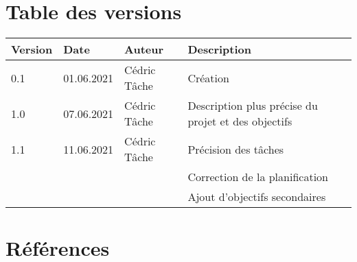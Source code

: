 \documentclass[french,11pt]{article}
\begin{document}


\section *{Table des versions}
\vspace*{0.5 cm}

\begin{table}[h]
    \begin{tabularx}{\columnwidth}{ | p{1.5cm} | p{1.7cm} | p{2.5cm} | X |}
        \hline
        \textbf{Version} & \textbf{Date} & \textbf{Auteur} & \textbf{Description} \\
        \hline
        0.1 & 01.06.2021 & Cédric Tâche & Création \\
        1.0 & 07.06.2021 & Cédric Tâche & Description plus précise du projet et des objectifs \\
        1.1 & 11.06.2021 & Cédric Tâche & Précision des tâches \\
         & & & Correction de la planification \\
         & & & Ajout d'objectifs secondaires \\
        \hline
    \end{tabularx}
\end{table}


\newpage

\hypersetup{
	hidelinks,
	allcolors=black,
	linktocpage,
	linktoc=all
}

\tableofcontents

\newpage




\section{Références}

\renewcommand{\bibsection}{}

\end{document}
